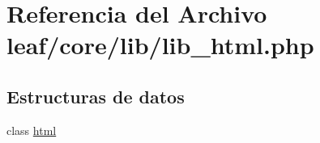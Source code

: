 \hypertarget{lib__html_8php}{\section{Referencia del Archivo leaf/core/lib/lib\-\_\-html.php}
\label{lib__html_8php}
}
\subsection*{Estructuras de datos}
\begin{DoxyCompactItemize}
\item 
class \hyperlink{classhtml}{html}
\end{DoxyCompactItemize}
